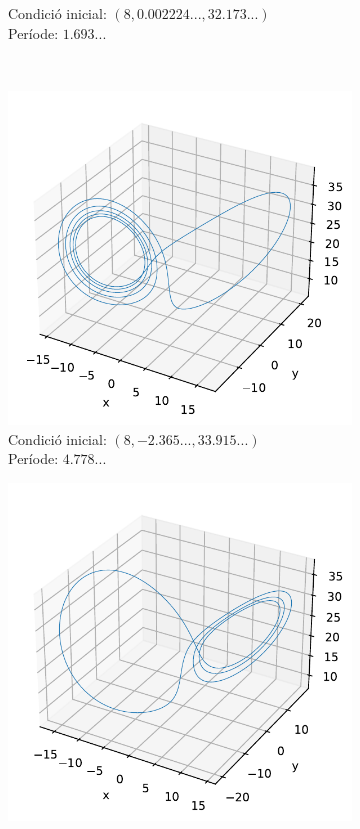 \documentclass[a4paper]{article}
\theoremstyle{definition}
\begin{document}
\begin{figure}[ht]
\begin{subfigure}[b]{0.45\linewidth}
    \caption{Condició inicial: $(8, 0.002224..., 32.173...)$\\ Període: $1.693...$}
    \label{fig2}
  \end{subfigure}
  \\
  \centering
  \begin{subfigure}[b]{0.45\linewidth}
    \centering
    \includegraphics[width=0.95\linewidth]{Images/op3-25-3.pdf}
    \caption{Condició inicial: $(8, -2.365..., 33.915...)$\\ Període: $4.778...$}
  \end{subfigure}
  \hfill
  \begin{subfigure}[b]{0.45\linewidth}
    \centering
    \includegraphics[width=0.95\linewidth]{Images/op3-25-4.pdf}

\end{subfigure}
\end{figure}
\end{document}
